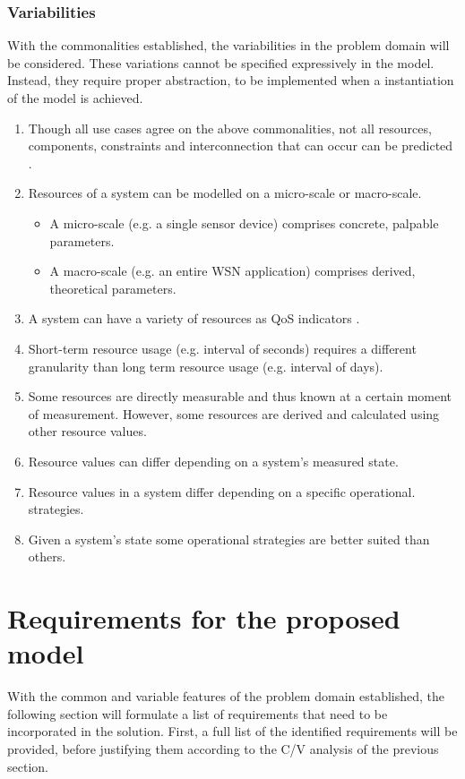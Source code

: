 \subsubsection{Variabilities}
With the commonalities established, the variabilities in the problem domain will be considered. These variations cannot be specified expressively in the model. Instead, they require proper abstraction, to be implemented when a instantiation of the model is achieved.
\begin{enumerate}[label=V\rdmid .\arabic*]
\nospace
\item \label{v:1obvious} Though all use cases agree on the above commonalities, not all resources, components, constraints and interconnection that can occur can be predicted \cite{qos_challenges}.
\item \label{v:2micro_macro} Resources of a system can be modelled on a micro-scale or macro-scale.
\begin{itemize}
\nospace
\item A micro-scale (e.g. a single sensor device) comprises concrete, palpable parameters.
\item A macro-scale (e.g. an entire WSN application) comprises derived, theoretical parameters.
\end{itemize}
\item \label{v:3nr_optimizer} A system can have a variety of resources as QoS indicators \cite{qos_challenges}.
\item \label{v:4granularity} Short-term resource usage (e.g. interval of seconds) requires a different granularity than long term resource usage (e.g. interval of days).
\item \label{v:5measure_vs_derive} Some resources are directly measurable and thus known at a certain moment of measurement. However, some resources are derived and calculated using other resource values.
\item \label{v:6state} Resource values can differ depending on a system's measured state.
\item \label{v:7function} Resource values in a system differ depending on a specific operational. strategies.
\item \label{v:8rum} Given a system's state some operational strategies are better suited than others.
\end{enumerate}

\section{Requirements for the proposed model}
With the common and variable features of the problem domain established, the following section will formulate a list of requirements that need to be incorporated in the solution. First, a full list of the identified requirements will be provided, before justifying them according to the C/V analysis of the previous section.
